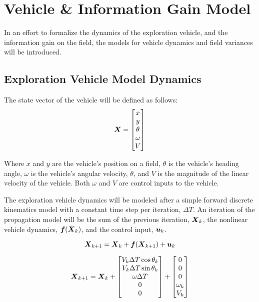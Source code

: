 \chapter{Vehicle \& Information Gain Model}
In an effort to formalize the dynamics of the exploration vehicle, and the information gain on the field, the models for vehicle dynamics and field variances will be introduced.

\section{Exploration Vehicle Model Dynamics} \label{sec:vehicledynamics}
The state vector of the vehicle will be defined as follows:
\begin{equation}
{\it{\boldsymbol{X}}} = \begin{bmatrix}
	x \\
	y \\
	\theta \\
	\omega \\
	V
\end{bmatrix}
\label{eq:vehiclemodel}
\end{equation}

Where $x$ and $y$ are the vehicle's position on a field, $\theta$ is the vehicle's heading angle, $\omega$ is the vehicle's angular velocity, $\dot{\theta}$, and $V$ is the magnitude of the linear velocity of the vehicle. Both $\omega$ and $V$ are control inputs to the vehicle.

The exploration vehicle dynamics will be modeled after a simple forward discrete kinematics model with a constant time step per iteration, $\Delta T$. An iteration of the propagation model will be the sum of the previous iteration, ${\it{\boldsymbol{X}}}_{k}$, the nonlinear vehicle dynamics, ${\it{\boldsymbol{f}}}({\it{\boldsymbol{X}}}_k)$, and the control input, ${\it{\boldsymbol{u}}}_k$.

\begin{equation}
	{\it{\boldsymbol{X}}}_{k+1} = {\it{\boldsymbol{X}}}_k + {\it{\boldsymbol{f}}}({\it{\boldsymbol{X}}}_{k+1}) + {\it{\boldsymbol{u}}}_k
	\label{eq:vehicledynamicsform}
\end{equation}

\begin{equation}
	{\it{\boldsymbol{X}}}_{k+1} = {\it{\boldsymbol{X}}}_k + \begin{bmatrix}
		V_k \Delta T \cos \theta_k \\
		V_k \Delta T \sin \theta_k \\
		\omega \Delta T \\
		0 \\
		0
	\end{bmatrix} + \begin{bmatrix}
	0 \\
	0 \\
	0 \\
	\omega_k \\
	V_k
	\end{bmatrix}
	\label{eq:vehicledynamicsmodel}
\end{equation}

